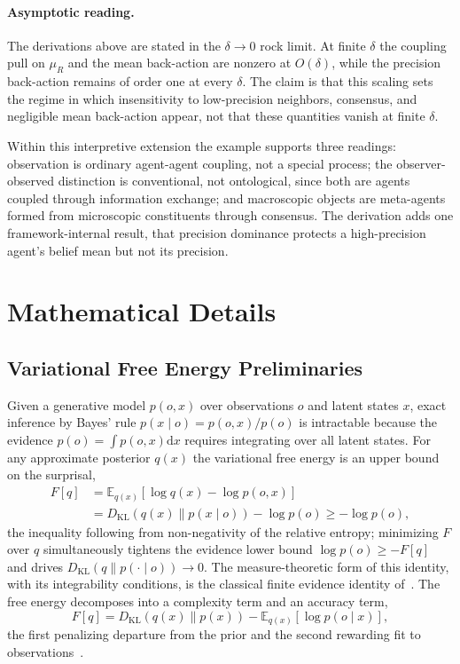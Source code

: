 \paragraph{Asymptotic reading.} The derivations above are stated in the $\delta \to 0$ rock limit. At finite $\delta$ the coupling pull on $\mu_R$ and the mean back-action are nonzero at $O(\delta)$, while the precision back-action remains of order one at every $\delta$. The claim is that this scaling sets the regime in which insensitivity to low-precision neighbors, consensus, and negligible mean back-action appear, not that these quantities vanish at finite $\delta$.

Within this interpretive extension the example supports three readings: observation is ordinary agent-agent coupling, not a special process; the observer-observed distinction is conventional, not ontological, since both are agents coupled through information exchange; and macroscopic objects are meta-agents formed from microscopic constituents through consensus. The derivation adds one framework-internal result, that precision dominance protects a high-precision agent's belief mean but not its precision.

\section{Mathematical Details}
\label{app:math}

\subsection{Variational Free Energy Preliminaries}
\label{app:variational_prelim}

Given a generative model $p(o, x)$ over observations $o$ and latent states $x$, exact inference by Bayes' rule $p(x \mid o) = p(o, x)/p(o)$ is intractable because the evidence $p(o) = \int p(o, x)\mathrm{d}x$ requires integrating over all latent states. For any approximate posterior $q(x)$ the variational free energy is an upper bound on the surprisal,
\begin{equation}
\begin{aligned}
F[q] &= \mathbb{E}_{q(x)}[\log q(x) - \log p(o, x)] \\
&= D_{\mathrm{KL}}(q(x) \| p(x \mid o)) - \log p(o) \geq -\log p(o),
\end{aligned}
\end{equation}
the inequality following from non-negativity of the relative entropy; minimizing $F$ over $q$ simultaneously tightens the evidence lower bound $\log p(o) \geq -F[q]$ and drives $D_{\mathrm{KL}}(q \| p(\cdot \mid o)) \to 0$. The measure-theoretic form of this identity, with its integrability conditions, is the classical finite evidence identity of~\cite[Ch.~5]{DennisGaugeVFE2026}. The free energy decomposes into a complexity term and an accuracy term,
\begin{equation}
F[q] = D_{\mathrm{KL}}(q(x) \| p(x)) - \mathbb{E}_{q(x)}[\log p(o \mid x)],
\end{equation}
the first penalizing departure from the prior and the second rewarding fit to observations~\cite{Friston2010, parr2022active}.

